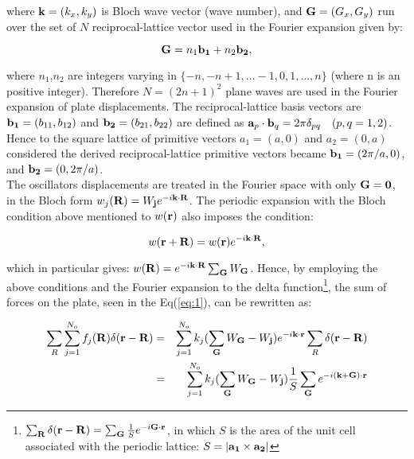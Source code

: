 \documentclass[a4paper]{ICEDyn}
\begin{document}
	where ${\bf k} = (k_x,k_y)$ is Bloch wave vector (wave number), and ${\bf G}=(G_x,G_y)$ run over the set of $N$ reciprocal-lattice vector used in the Fourier expansion given by:
	
	\begin{equation}\label{eqG}
	{\bf G} = n_1{\bf b_1}+n_2{\bf b_2},
	\end{equation}
	
	where $n_1$,$n_2$ are integers varying in $\{-n,-n+1,...-1,0,1,...,n\}$ (where n is an positive integer). Therefore $N=(2n+1)^2$ plane waves are used in the Fourier expansion of plate displacements. The reciprocal-lattice basis vectors are ${\bf b_1}=(b_{11},b_{12})$ and ${\bf b_2}=(b_{21},b_{22})$ are defined as ${\bf a}_p\cdot {\bf b}_q = 2\pi\delta_{pq} {\ \ \ } (p,q = 1,2)$. Hence to the square lattice of primitive vectors $a_1= (a,0)$ and $a_2=(0,a)$ considered the derived reciprocal-lattice primitive vectors became ${\bf b_1} = (2\pi/a,0)$, and ${\bf b_2} = (0, 2\pi/a)$. \\	
	The oscillators displacements are treated in the Fourier space with only ${\bf G}={\bf 0}$, in the Bloch form $w_j({\bf R}) =  W_{{\bf j}}e^{-i {\bf k} \cdot{\bf R}}$. The periodic expansion with the Bloch condition above mentioned to $w({\bf r})$ also imposes the condition:
	
	\begin{equation}\label{eq:7}
	w({\bf r}+{\bf R}) = w({\bf r})e^{-i{\bf k}\cdot{\bf R}},
	\end{equation}

which in particular gives: $w({\bf R})= e^{-i{\bf k }\cdot {\bf R}}\sum_{\bf G} W_{\bf G}$. Hence, by employing the above conditions and the Fourier expansion to the delta function\footnote{$\sum_{{\bf R}}\delta({\bf r}-{\bf R})=\sum_{{\bf G}}\frac{1}{S}e^{-i{\bf G}\cdot{\bf r}}$, in which $S$ is the area of the unit cell associated with the periodic lattice: $S = \left| {\bf a_{1} \times \bf a_{2}}\right|$}, the sum of forces on the plate, seen in the Eq(\ref{eq:1}), can be rewritten as:
	
	\begin{eqnarray}
	\sum_{{R}}\sum_{j=1}^{N_o}f_{j}({\bf R})\delta({\bf r}-{\bf R}) &=& \sum_{j=1}^{N_o}k_j (\sum_{\bf G} W_{\bf G} - W_{\bf j})e^{-i{\bf k} \cdot {\bf r}}\sum_{R}\delta({\bf r}-{\bf R})\nonumber\\
	&=&
\sum_{j=1}^{N_o}k_j (\sum_{\bf G} W_{\bf G} - W_{\bf j})\frac{1}{S}\sum_{{\bf G}}e^{-i\left({\bf k} + {\bf G} \right)\cdot{\bf r}}\label{eq:8}
	\end{eqnarray}
	
\end{document}
